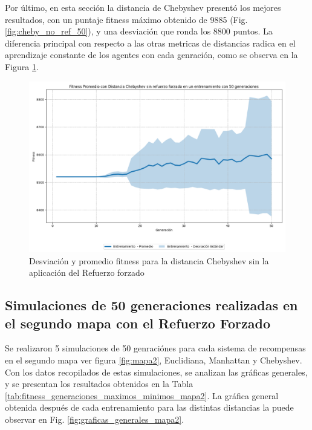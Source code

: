 \documentclass[lettersize, journal]{IEEEtran}
\begin{document}
Por último, en esta sección la distancia de Chebyshev presentó los mejores resultados, con un puntaje fitness máximo obtenido de 9885 (Fig. \ref{fig:cheby_no_ref_50}), y una desviación que ronda los 8800 puntos. La diferencia principal con respecto a las otras metricas de distancias radica en el aprendizaje constante de los agentes con cada genración, como se observa en la Figura \ref{fig:no_refoice_chy_desv}.
\begin{figure}[H]
    \centering
    \includegraphics[width=0.8\linewidth]{Sin_Refuerzo_50Gen/Cheby_NoRef_50Gen_Sombra.png}
    \caption{Desviación y promedio fitness para la distancia Chebyshev sin la aplicación del Refuerzo forzado}
    \label{fig:no_refoice_chy_desv}
\end{figure}

\subsection{Simulaciones de 50 generaciones realizadas en el segundo mapa con el Refuerzo Forzado}
Se realizaron 5 simulaciones de 50 genraciónes para cada sistema de recompensas en el segundo mapa ver figura \ref{fig:mapa2}, Euclidiana, Manhattan y Chebyshev. Con los datos recopilados de estas simulaciones, se analizan las gráficas generales, y se presentan los resultados obtenidos en la Tabla \ref{tab:fitness_generaciones_maximos_minimos_mapa2}. La gráfica general obtenida después de cada entrenamiento para las distintas distancias la puede observar en Fig. \ref{fig:graficas_generales_mapa2}.
\end{document}

